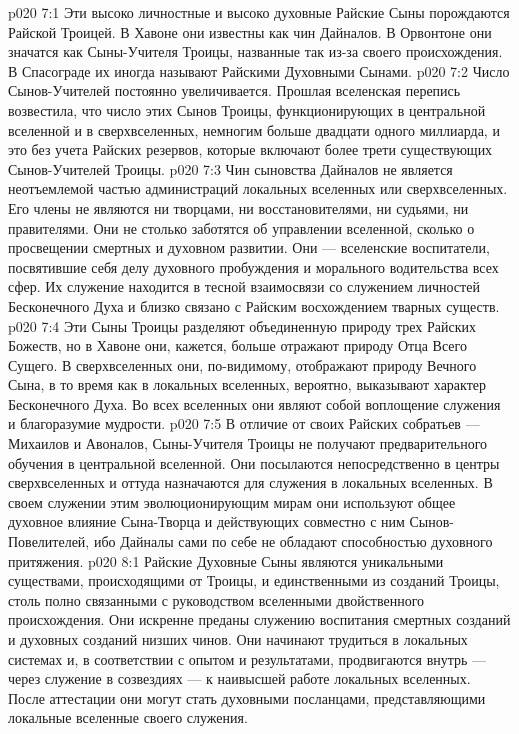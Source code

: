 \vs p020 7:1 Эти высоко личностные и высоко духовные Райские Сыны порождаются Райской Троицей. В Хавоне они известны как чин Дайналов. В Орвонтоне они значатся как Сыны\hyp{}Учителя Троицы, названные так из\hyp{}за своего происхождения. В Спасограде их иногда называют Райскими Духовными Сынами.
\vs p020 7:2 Число Сынов\hyp{}Учителей постоянно увеличивается. Прошлая вселенская перепись возвестила, что число этих Сынов Троицы, функционирующих в центральной вселенной и в сверхвселенных, немногим больше двадцати одного миллиарда, и это без учета Райских резервов, которые включают более трети существующих Сынов\hyp{}Учителей Троицы.
\vs p020 7:3 Чин сыновства Дайналов не является неотъемлемой частью администраций локальных вселенных или сверхвселенных. Его члены не являются ни творцами, ни восстановителями, ни судьями, ни правителями. Они не столько заботятся об управлении вселенной, сколько о просвещении смертных и духовном развитии. Они --- вселенские воспитатели, посвятившие себя делу духовного пробуждения и морального водительства всех сфер. Их служение находится в тесной взаимосвязи со служением личностей Бесконечного Духа и близко связано с Райским восхождением тварных существ.
\vs p020 7:4 Эти Сыны Троицы разделяют объединенную природу трех Райских Божеств, но в Хавоне они, кажется, больше отражают природу Отца Всего Сущего. В сверхвселенных они, по\hyp{}видимому, отображают природу Вечного Сына, в то время как в локальных вселенных, вероятно, выказывают характер Бесконечного Духа. Во всех вселенных они являют собой воплощение служения и благоразумие мудрости.
\vs p020 7:5 В отличие от своих Райских собратьев --- Михаилов и Авоналов, Сыны\hyp{}Учителя Троицы не получают предварительного обучения в центральной вселенной. Они посылаются непосредственно в центры сверхвселенных и оттуда назначаются для служения в локальных вселенных. В своем служении этим эволюционирующим мирам они используют общее духовное влияние Сына\hyp{}Творца и действующих совместно с ним Сынов\hyp{}Повелителей, ибо Дайналы сами по себе не обладают способностью духовного притяжения.
\vs p020 8:1 Райские Духовные Сыны являются уникальными существами, происходящими от Троицы, и единственными из созданий Троицы, столь полно связанными с руководством вселенными двойственного происхождения. Они искренне преданы служению воспитания смертных созданий и духовных созданий низших чинов. Они начинают трудиться в локальных системах и, в соответствии с опытом и результатами, продвигаются внутрь --- через служение в созвездиях --- к наивысшей работе локальных вселенных. После аттестации они могут стать духовными посланцами, представляющими локальные вселенные своего служения.

